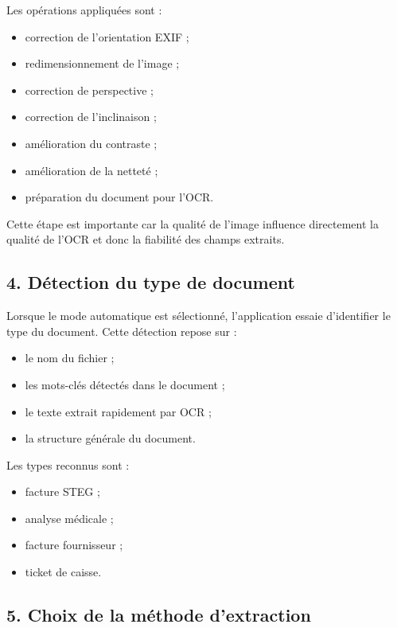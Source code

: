 \documentclass[12pt,a4paper]{report}
\begin{document}
Les opérations appliquées sont :

\begin{itemize}
    \item correction de l'orientation EXIF ;
    \item redimensionnement de l'image ;
    \item correction de perspective ;
    \item correction de l'inclinaison ;
    \item amélioration du contraste ;
    \item amélioration de la netteté ;
    \item préparation du document pour l'OCR.
\end{itemize}

Cette étape est importante car la qualité de l'image influence directement la qualité de l'OCR et donc la fiabilité des champs extraits.

\subsection*{4. Détection du type de document}

Lorsque le mode automatique est sélectionné, l'application essaie d'identifier le type du document. Cette détection repose sur :

\begin{itemize}
    \item le nom du fichier ;
    \item les mots-clés détectés dans le document ;
    \item le texte extrait rapidement par OCR ;
    \item la structure générale du document.
\end{itemize}

Les types reconnus sont :

\begin{itemize}
    \item facture STEG ;
    \item analyse médicale ;
    \item facture fournisseur ;
    \item ticket de caisse.
\end{itemize}

\subsection*{5. Choix de la méthode d'extraction}
\end{document}
